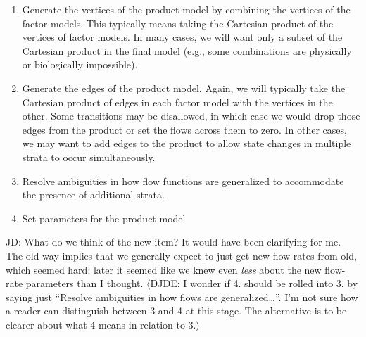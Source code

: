 \documentclass[referee,sn-basic]{sn-jnl}%
\theoremstyle{definition}
\newcommand{\jd}[1]{{\color{blue} JD: #1}}
\newcommand{\david}[1]{{\color{cyan} $\langle$DJDE: #1$\rangle$}}
\begin{document}
\begin{enumerate}
    \item Generate the vertices of the product model by combining the vertices of the factor models. This typically means taking the Cartesian product of the vertices of factor models. In many cases, we will want only a subset of the Cartesian product in the final model (e.g., some combinations are physically or biologically impossible).
    \item Generate the edges of the product model. Again, we will typically take the Cartesian product of edges in each factor model with the vertices in the other. Some transitions may be disallowed, in which case we would drop those edges from the product or set the flows across them to zero. In other cases, we may want to add edges to the product to allow state changes in multiple strata to occur simultaneously.
    \item Resolve ambiguities in how flow functions are generalized to accommodate the presence of additional strata.
    \item Set parameters for the product model
\end{enumerate}
\jd{What do we think of the new item? It would have been clarifying for me. The old way implies that we generally expect to just get new flow rates from old, which seemed hard; later it seemed like we knew even \emph{less} about the new flow-rate parameters than I thought.}
\david{I wonder if 4. should be rolled into 3. by saying just ``Resolve ambiguities in how flows are generalized\dots''.  I'm not sure how a reader can distinguish between 3 and 4 at this stage. The alternative is to be clearer about what 4 means in relation to 3.}
\end{document}
